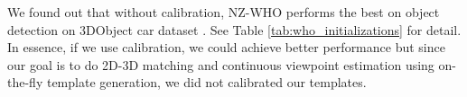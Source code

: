 \documentclass[10pt,twocolumn,letterpaper]{article}
\begin{document}
We found out that without calibration, NZ-WHO performs the best on object detection on 3DObject car dataset \cite{Savarese07}. See Table \ref{tab:who_initializations} for detail. In essence, if we use calibration, we could achieve better performance but since our goal is to do 2D-3D matching and continuous viewpoint estimation using on-the-fly template generation, we did not calibrated our templates.

\end{document}
